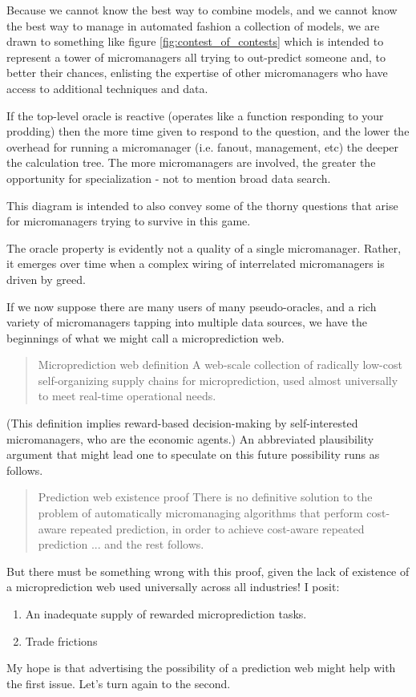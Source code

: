 Because we cannot know the best way to combine models, and we cannot know the best way to manage in automated fashion a collection of models, we are drawn to something like figure \ref{fig:contest_of_contests} which is intended to represent a tower of micromanagers all trying to out-predict someone and, to better their chances, enlisting the expertise of other micromanagers who have access to additional techniques and data. 

If the top-level oracle is reactive (operates like a function responding to your prodding) then the more time given to respond to the question, and the lower the overhead for running a micromanager (i.e. fanout, management, etc) the deeper the calculation tree. The more micromanagers are involved, the greater the opportunity for specialization - not to mention broad data search.  

This diagram is intended to also convey some of the thorny questions that arise for micromanagers trying to survive in this game. 

The oracle property is evidently not a quality of a single micromanager. Rather, it emerges over time when a complex wiring of interrelated micromanagers is driven by greed. 

If we now suppose there are many users of many pseudo-oracles, and a rich variety of micromanagers tapping into multiple data sources, we have the beginnings of what we might call a microprediction web. 
\begin{quote}{Microprediction web definition}
A web-scale collection of radically low-cost self-organizing supply chains for microprediction, used almost universally to meet real-time operational needs.  
\end{quote}
(This definition implies reward-based decision-making by self-interested micromanagers, who are the economic agents.) An abbreviated plausibility argument that might lead one to speculate on this future possibility runs as follows.
\begin{quote}{Prediction web existence proof}
There is no definitive solution to the problem of automatically micromanaging algorithms that perform cost-aware repeated prediction, in order to achieve cost-aware repeated prediction ... and the rest follows.  
\end{quote}
But there must be something wrong with this proof, given the lack of existence of a microprediction web used universally across all industries! I posit:
\begin{enumerate}
    \item An inadequate supply of rewarded microprediction tasks. 
    \item Trade frictions
\end{enumerate}
My hope is that advertising the possibility of a prediction web might help with the first issue. Let's turn again to the second. 
